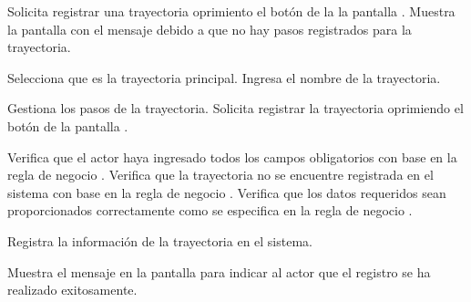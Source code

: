  \begin{UCtrayectoria}
	\UCpaso[\UCactor] Solicita registrar una trayectoria oprimiento el botón  de la la pantalla . 
	\UCpaso[\UCsist] Muestra la pantalla  con el mensaje  debido a que no hay pasos registrados para la trayectoria. 
	
	\UCpaso[\UCactor] Selecciona que es la trayectoria principal. \label{cu5.1.1.1:ingresaDatos}
	\UCpaso[\UCactor] Ingresa el nombre de la trayectoria.
	
	\UCpaso[\UCactor] Gestiona los pasos de la trayectoria. \label{cu5.1.1.1:gestionaPasos}
	\UCpaso[\UCactor] Solicita registrar la trayectoria oprimiendo el botón  de la pantalla .  
	
	\UCpaso[\UCsist] Verifica que el actor haya ingresado todos los campos obligatorios con base en la regla de negocio . 
	\UCpaso[\UCsist] Verifica que la trayectoria no se encuentre registrada en el sistema con base en la regla de negocio . 
	\UCpaso[\UCsist] Verifica que los datos requeridos sean proporcionados correctamente como se especifica en la regla de negocio .  
	
	\UCpaso[\UCsist] Registra la información de la trayectoria en el sistema.
	
	\UCpaso[\UCsist] Muestra el mensaje  en la pantalla  
	para indicar al actor que el registro se ha realizado exitosamente.
    
\end{UCtrayectoria}
    
